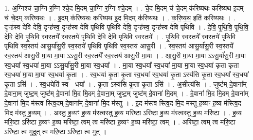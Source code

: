 \documentclass[17pt]{extarticle}
\begin{document}
1. अ॒ग्निश्च॑ चा॒ग्नि र॒ग्नि श्चे॒द मि॒दम् चा॒ग्नि र॒ग्नि श्चे॒दम् । . चे॒द मि॒दम् च॑ चे॒दम् क॑रिष्यथः करिष्यथ इ॒दम् च॑ चे॒दम् क॑रिष्यथः । . इ॒दम् क॑रिष्यथः करिष्यथ इ॒द मि॒दम् क॑रिष्यथः । . क॒रि॒ष्य॒थ॒ इति॑ करिष्यथः । . दृꣳह॑स्व देवि देवि॒ दृꣳह॑स्व॒ दृꣳह॑स्व देवि पृथिवि पृथिवि देवि॒ दृꣳह॑स्व॒ दृꣳह॑स्व देवि पृथिवि । . दे॒वि॒ पृ॒थि॒वि॒ पृ॒थि॒वि॒ दे॒वि॒ दे॒वि॒ पृ॒थि॒वि॒ स्व॒स्तये᳚ स्व॒स्तये॑ पृथिवि देवि देवि पृथिवि स्व॒स्तये᳚ । . पृ॒थि॒वि॒ स्व॒स्तये᳚ स्व॒स्तये॑ पृथिवि पृथिवि स्व॒स्तय॑ आसु॒र्या॑सु॒री स्व॒स्तये॑ पृथिवि पृथिवि स्व॒स्तय॑ आसु॒री । . स्व॒स्तय॑ आसु॒र्या॑सु॒री स्व॒स्तये᳚ स्व॒स्तय॑ आसु॒री मा॒या मा॒या ऽऽसु॒री स्व॒स्तये᳚ स्व॒स्तय॑ आसु॒री मा॒या । . आ॒सु॒री मा॒या मा॒या ऽऽसु॒र्या॑सु॒री मा॒या स्व॒धया᳚ स्व॒धया॑ मा॒या ऽऽसु॒र्या॑सु॒री मा॒या स्व॒धया᳚ । . मा॒या स्व॒धया᳚ स्व॒धया॑ मा॒या मा॒या स्व॒धया॑ कृ॒ता कृ॒ता स्व॒धया॑ मा॒या मा॒या स्व॒धया॑ कृ॒ता । . स्व॒धया॑ कृ॒ता कृ॒ता स्व॒धया᳚ स्व॒धया॑ कृ॒ता ऽस्य॑सि कृ॒ता स्व॒धया᳚ स्व॒धया॑ कृ॒ता ऽसि॑ । . स्व॒धयेति॑ स्व - धया᳚ । . कृ॒ता ऽस्य॑सि कृ॒ता कृ॒ता ऽसि॑ । . अ॒सीत्य॑सि । . जुष्ट॑म् दे॒वाना᳚म् दे॒वाना॒म् जुष्ट॒म् जुष्ट॑म् दे॒वाना॑ मि॒द मि॒दम् दे॒वाना॒म् जुष्ट॒म् जुष्ट॑म् दे॒वाना॑ मि॒दम् । . दे॒वाना॑ मि॒द मि॒दम् दे॒वाना᳚म् दे॒वाना॑ मि॒द म॑स्त्व स्त्वि॒दम् दे॒वाना᳚म् दे॒वाना॑ मि॒द म॑स्तु । . इ॒द म॑स्त्व स्त्वि॒द मि॒द म॑स्तु ह॒व्यꣳ ह॒व्य म॑स्त्वि॒द मि॒द म॑स्तु ह॒व्यम् । . अ॒स्तु॒ ह॒व्यꣳ ह॒व्य म॑स्त्वस्तु ह॒व्य मरि॒ष्टा ऽरि॑ष्टा ह॒व्य म॑स्त्वस्तु ह॒व्य मरि॑ष्टा । . ह॒व्य मरि॒ष्टा ऽरि॑ष्टा ह॒व्यꣳ ह॒व्य मरि॑ष्टा॒ त्वम् त्व मरि॑ष्टा ह॒व्यꣳ ह॒व्य मरि॑ष्टा॒ त्वम् । . अरि॑ष्टा॒ त्वम् त्व मरि॒ष्टा ऽरि॑ष्टा॒ त्व मुदुत् त्व मरि॒ष्टा ऽरि॑ष्टा॒ त्व मुत् । \newline
\end{document}
